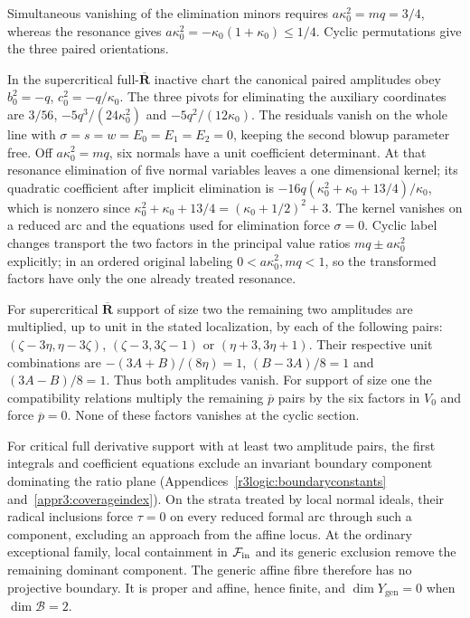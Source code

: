 \documentclass[11pt,a4paper]{article}
\numberwithin{equation}{section}
\theoremstyle{plain}
\theoremstyle{definition}
\theoremstyle{remark}
\begin{document}
Simultaneous vanishing of the elimination minors requires
$a\kappa_0^2=mq=3/4$, whereas the resonance gives
$a\kappa_0^2=-\kappa_0(1+\kappa_0)\le1/4$.
Cyclic permutations give the three paired orientations.

In the supercritical full-$\overline{\boldsymbol R}$ inactive chart the canonical paired amplitudes obey $b_0^2=-q$, $c_0^2=-q/\kappa_0 $. The three pivots for eliminating the auxiliary coordinates are $3/56$, $-5q^3/(24\kappa_0 ^2)$ and $-5q^2/(12\kappa_0 )$. The residuals vanish on the whole line with $\sigma=s=w=E_0=E_1=E_2=0$, keeping the second blowup parameter free. Off $a\kappa_0 ^2=mq$, six normals have a unit coefficient determinant. At that resonance elimination of five normal variables leaves a one dimensional kernel; its quadratic coefficient after implicit elimination is $-16q(\kappa_0 ^2+\kappa_0 +13/4)/\kappa_0 $, which is nonzero since $\kappa_0 ^2+\kappa_0 +13/4=(\kappa_0 +1/2)^2+3$. The kernel vanishes on a reduced arc and the equations used for elimination force $\sigma=0$. Cyclic label changes transport the two factors in the principal value ratios $mq\pm a\kappa_0 ^2$ explicitly; in an ordered original labeling $0<a\kappa_0 ^2,mq<1$, so the transformed factors have only the one already treated resonance.

For supercritical $\overline{\boldsymbol R}$ support of size two the remaining two amplitudes are multiplied, up to unit in the stated localization, by each of the following pairs: $(\zeta -3\eta ,\eta -3\zeta )$, $(\zeta -3,3\zeta -1)$ or $(\eta +3,3\eta +1)$. Their respective unit combinations are $-(3A+B)/(8\eta )=1$, $(B-3A)/8=1$ and $(3A-B)/8=1$. Thus both amplitudes vanish. For support of size one the compatibility relations multiply the remaining $\overline p$ pairs by the six factors in $V_0$ and force $\overline p=0$. None of these factors vanishes at the cyclic section. 

For critical full derivative support with at least two amplitude
pairs, the first integrals and coefficient equations exclude an
invariant boundary component dominating the ratio plane
(Appendices~\ref{r3logic:boundaryconstants} and~\ref{appr3:coverageindex}).
On the strata treated by local normal ideals, their radical
inclusions force $\tau=0$ on every reduced formal arc through such
a component, excluding an approach from the affine locus. At the
ordinary exceptional family, local containment in $\mathcal F_{\rm in}$
and its generic exclusion remove the remaining dominant component.
The generic affine fibre therefore has no projective boundary. It is proper and
affine, hence finite, and $\dim Y_{\mathrm{gen}}=0$ when $\dim\mathscr B=2$.
\end{document}
